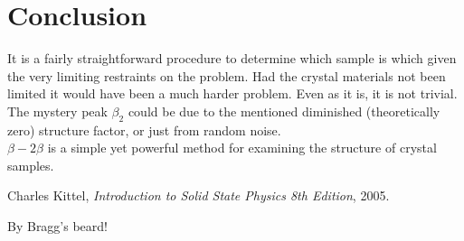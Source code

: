 \documentclass[a4paper,twoside=false,abstract=false,numbers=noenddot,
titlepage=false,headings=small,parskip=half,version=last]{scrartcl}
\begin{document}
\section{Conclusion}
It is a fairly straightforward procedure to determine which sample is which given the very limiting restraints on the problem.
Had the crystal materials not been limited it would have been a much harder problem. Even as it is, it is not trivial.
The mystery peak $\beta_2$ could be due to the mentioned diminished (theoretically zero) structure factor, or just from random noise.\\
$\beta-2\beta$ is a simple yet powerful method for examining the structure of crystal samples.

\begin{thebibliography}{1}
        Charles Kittel,
        {\em Introduction to Solid State Physics 8th Edition},
        2005.
\end{thebibliography}


\textcolor{braggred}{By Bragg's beard!}
\end{document}
